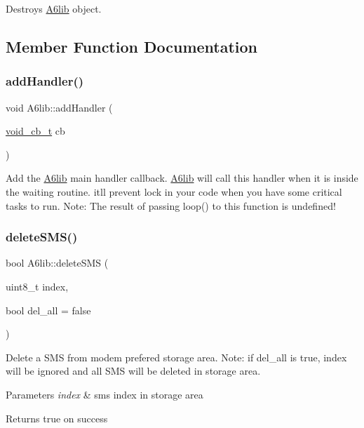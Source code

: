 Destroys \mbox{\hyperlink{class_a6lib}{A6lib}} object. 

\subsection{Member Function Documentation}
\mbox{\label{class_a6lib_ab9580c0720252ad9e2d6b67683e3e88f}} 
\subsubsection{\texorpdfstring{add\+Handler()}{addHandler()}}
{\footnotesize\ttfamily void A6lib\+::add\+Handler (\begin{DoxyParamCaption}\item[{\mbox{\hyperlink{_a6lib_8h_a7a1b65425109a6c0a0d203c1fe9bbbe5}{void\+\_\+cb\+\_\+t}}}]{cb }\end{DoxyParamCaption})}

Add the \mbox{\hyperlink{class_a6lib}{A6lib}} main handler callback. \mbox{\hyperlink{class_a6lib}{A6lib}} will call this handler when it is inside the waiting routine. it\textquotesingle{}ll prevent lock in your code when you have some critical tasks to run. Note\+: The result of passing loop() to this function is undefined! \mbox{\label{class_a6lib_acb407d54e8ab25e7549b721ef090c686}} 
\subsubsection{\texorpdfstring{delete\+S\+M\+S()}{deleteSMS()}}
{\footnotesize\ttfamily bool A6lib\+::delete\+S\+MS (\begin{DoxyParamCaption}\item[{uint8\+\_\+t}]{index,  }\item[{bool}]{del\+\_\+all = {\ttfamily false} }\end{DoxyParamCaption})}

Delete a S\+MS from modem prefered storage area. Note\+: if del\+\_\+all is true, index will be ignored and all S\+MS will be deleted in storage area. 
\begin{DoxyParams}{Parameters}
{\em index} & sms index in storage area \\
\hline
\end{DoxyParams}
\begin{DoxyReturn}{Returns}
true on success 
\end{DoxyReturn}
\mbox{\label{class_a6lib_a4f3b148920be62b633fbfde7cf4d9b06}} 
